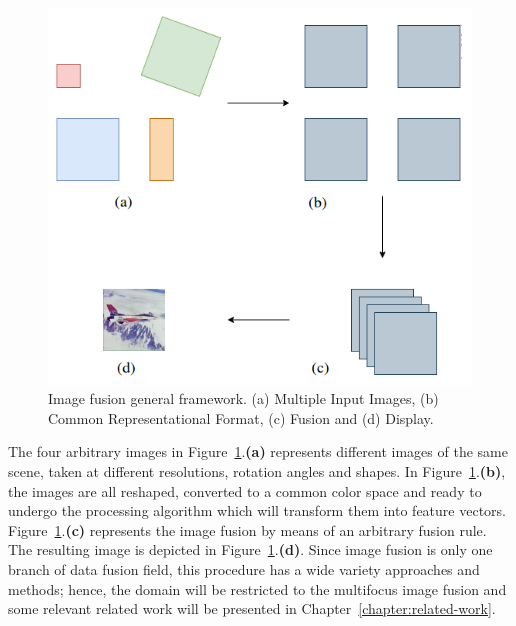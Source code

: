 \begin{figure}[H]
	\centering
	\caption{\label{fig:fusion_general_framework}Image fusion general framework. (a) Multiple Input Images, (b) Common Representational Format, (c) Fusion and (d) Display.}
	\begin{center}
    \includegraphics[scale=0.4]{images/image_fusion_scheme.png}
	\end{center}
	\centering
    \fautor
\end{figure}

The four arbitrary images in Figure~\ref{fig:fusion_general_framework}.\textbf{(a)} represents different images of the same scene, taken at different resolutions, rotation angles and shapes. In Figure~\ref{fig:fusion_general_framework}.\textbf{(b)}, the images are all reshaped, converted to a common color space and ready to undergo the processing algorithm which will transform them into feature vectors. Figure~\ref{fig:fusion_general_framework}.\textbf{(c)} represents the image fusion by means of an arbitrary fusion rule. The resulting image is depicted in Figure~\ref{fig:fusion_general_framework}.\textbf{(d)}. Since image fusion is only one branch of data fusion field, this procedure has a wide variety approaches and methods; hence, the domain will be restricted to the multifocus image fusion and some relevant related work will be presented in Chapter~\ref{chapter:related-work}.